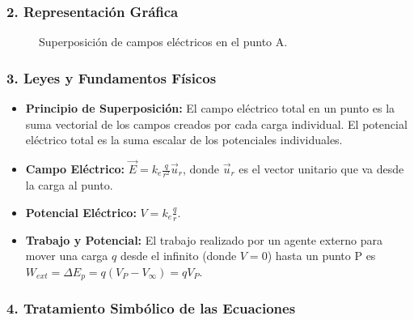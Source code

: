\subsubsection*{2. Representación Gráfica}
\begin{figure}[H]
    \centering
    \caption{Superposición de campos eléctricos en el punto A.}
\end{figure}

\subsubsection*{3. Leyes y Fundamentos Físicos}
\begin{itemize}
    \item \textbf{Principio de Superposición:} El campo eléctrico total en un punto es la suma vectorial de los campos creados por cada carga individual. El potencial eléctrico total es la suma escalar de los potenciales individuales.
    \item \textbf{Campo Eléctrico:} $\vec{E} = k_e \frac{q}{r^2} \vec{u}_r$, donde $\vec{u}_r$ es el vector unitario que va desde la carga al punto.
    \item \textbf{Potencial Eléctrico:} $V = k_e \frac{q}{r}$.
    \item \textbf{Trabajo y Potencial:} El trabajo realizado por un agente externo para mover una carga $q$ desde el infinito (donde $V=0$) hasta un punto P es $W_{ext} = \Delta E_p = q(V_P - V_\infty) = qV_P$.
\end{itemize}

\subsubsection*{4. Tratamiento Simbólico de las Ecuaciones}
